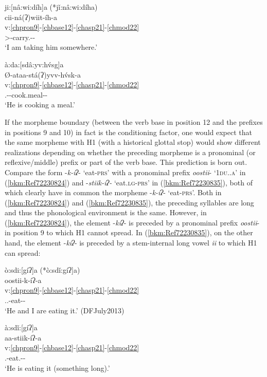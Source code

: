 \documentclass[output=paper]{langscibook}
\begin{document}
\ea\label{bkm:Ref101100012} {ji:[nâ:wi:díh]a  (*jǐ:nâ:wi:díha)} \\
\glll cii-ná(ʔ)wiit-íh-a\\ 
v:\ref{chpron9}-\ref{chbase12}-\ref{chasp21}-\ref{chmod22}\\ 
\First\Sg{}>\An{}-carry.\Fl{}-\Prs{}-\Ind{}\\ 
\glt `I am taking him somewhere.' \citep[104]{Feeling1975}
\z 

\ea\label{bkm:Ref101100203} {à:da:[sdâ:yv:h\'{v}sg]a}\\
\glll Ø-ataa-stá(ʔ)yvv-h\'{v}sk-a\\ 
v:\ref{chpron9}-\ref{chbase12}-\ref{chasp21}-\ref{chmod22}\\
\Third\Sg.\Aarg{}-\Refl-cook.meal-\Prs{}-\Ind{}\\ 
\glt `He is cooking a meal.' \citep[7]{Feeling1975}
\z 

If the morpheme boundary (between the verb base in position 12 and the prefixes in positions  9 and 10) in fact is the conditioning factor, one would expect that the same morpheme with H1 (with a historical glottal stop) would show different realizations depending on whether the preceding morpheme is a pronominal (or reflexive/middle) prefix or part of the verb base. This prediction is born out. Compare the form -\textit{k-íʔ}{}- `eat-\textsc{prs}' with a pronominal prefix \textit{oostii}{}- `\textsc{1du.\Excl.a'} in (\ref{bkm:Ref72230824}) and -\textit{stiik-íʔ-} `eat.\textsc{lg-prs'} in (\ref{bkm:Ref72230835}), both of which clearly have in common the morpheme -\textit{k-íʔ}{}- `eat-\textsc{prs}'. Both in (\ref{bkm:Ref72230824}) and (\ref{bkm:Ref72230835}), the preceding syllables are long and thus the phonological environment is the same. However, in (\ref{bkm:Ref72230824}), the element -\textit{kíʔ}{}- is preceded by a pronominal prefix \textit{oostii}{}- in position 9 to which H1 cannot spread. In (\ref{bkm:Ref72230835}), on the other hand, the element -\textit{kíʔ}{}- is preceded by a stem-internal long vowel \textit{ii} to which H1 can spread:

\ea\label{bkm:Ref72230824}ò:sdi:[gíʔ]a (*ò:sdǐ:gíʔ]a) \\
\glll oostii-k-íʔ-a\\
v:\ref{chpron9}-\ref{chbase12}-\ref{chasp21}-\ref{chmod22}\\
\First\Du{}.\Excl.\Aarg{}-eat-\Prs{}-\Ind{}\\ 
\glt `He and I are eating it.' (DFJuly2013)
\z  

\ea\label{bkm:Ref72230835}à:sdǐ:[gíʔ]a \\
\glll aa-stiik-íʔ-a\\
v:\ref{chpron9}-\ref{chbase12}-\ref{chasp21}-\ref{chmod22}\\
\Third\Sg.\Aarg{}-eat.\Lg{}-\Prs{}-\Ind{}\\
\glt `He is eating it (something long).' \citep[47]{Feeling1975}
\z 
\end{document}
